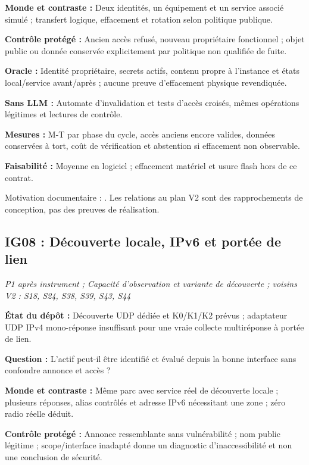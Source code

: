 \documentclass[11pt,a4paper]{article}
\begin{document}
\textbf{Monde et contraste :} Deux identités, un équipement et un service associé simulé ; transfert logique, effacement et rotation selon politique publique.

\textbf{Contrôle protégé :} Ancien accès refusé, nouveau propriétaire fonctionnel ; objet public ou donnée conservée explicitement par politique non qualifiée de fuite.

\textbf{Oracle :} Identité propriétaire, secrets actifs, contenu propre à l'instance et états local/service avant/après ; aucune preuve d'effacement physique revendiquée.

\textbf{Sans LLM :} Automate d'invalidation et tests d'accès croisés, mêmes opérations légitimes et lectures de contrôle.

\textbf{Mesures :} M-T par phase du cycle, accès anciens encore valides, données conservées à tort, coût de vérification et abstention si effacement non observable.

\textbf{Faisabilité :} Moyenne en logiciel ; effacement matériel et usure flash hors de ce contrat.

Motivation documentaire : \cite{nist,etsi}. Les relations au plan V2 sont des rapprochements de conception, pas des preuves de réalisation.

\begin{samepage}\subsection{IG08 : Découverte locale, IPv6 et portée de lien}
\textit{P1 après instrument ; Capacité d'observation et variante de découverte ; voisins V2 : S18, S24, S38, S39, S43, S44}

\textbf{État du dépôt :} Découverte UDP dédiée et K0/K1/K2 prévus ; adaptateur UDP IPv4 mono-réponse insuffisant pour une vraie collecte multiréponse à portée de lien.
\par\end{samepage}
\textbf{Question :} L'actif peut-il être identifié et évalué depuis la bonne interface sans confondre annonce et accès ?

\textbf{Monde et contraste :} Même parc avec service réel de découverte locale ; plusieurs réponses, alias contrôlés et adresse IPv6 nécessitant une zone ; zéro radio réelle déduit.

\textbf{Contrôle protégé :} Annonce ressemblante sans vulnérabilité ; nom public légitime ; scope/interface inadapté donne un diagnostic d'inaccessibilité et non une conclusion de sécurité.
\end{document}
